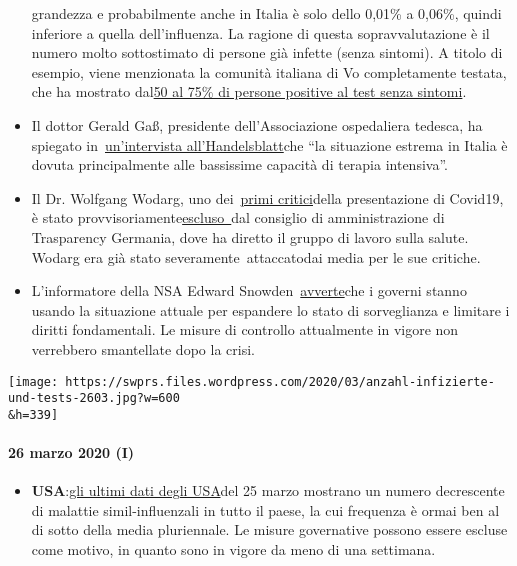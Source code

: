 \begin{itemize}
  grandezza e probabilmente anche in Italia è solo dello 0,01\% a
  0,06\%, quindi inferiore a quella dell'influenza. La ragione di questa
  sopravvalutazione è il numero molto sottostimato di persone già
  infette (senza sintomi). A titolo di esempio, viene menzionata la
  comunità italiana di Vo completamente testata, che ha mostrato
  dal\href{https://www.repubblica.it/salute/medicina-e-ricerca/2020/03/16/news/coronavirus_studio_il_50-75_dei_casi_a_vo_sono_asintomatici_e_molto_contagiosi-251474302/}{50
  al 75\% di persone positive al test senza sintomi}.
\item
  Il dottor Gerald Gaß, presidente dell'Associazione ospedaliera
  tedesca, ha spiegato
  in~\href{https://www.handelsblatt.com/politik/deutschland/coronakrise-deutsche-krankenhausgesellschaft-wir-sind-besser-vorbereitet-als-italien/25651268.html}{un'intervista
  all'Handelsblatt}che ``la situazione estrema in Italia è dovuta
  principalmente alle bassissime capacità di terapia intensiva''.
\item
  Il Dr. Wolfgang Wodarg, uno
  dei~\href{https://www.youtube.com/watch?v=p_AyuhbnPOI}{primi
  critici}della presentazione di Covid19, è stato
  provvisoriamente\href{https://www.transparency.de/aktuelles/detail/article/in-eigener-sache-vorstand-beschliesst-ruhen-der-mitgliedschaft-von-wolfgang-wodarg-1/}{escluso~}dal
  consiglio di amministrazione di Trasparency Germania, dove ha diretto
  il gruppo di lavoro sulla salute. Wodarg era già stato
  severamente~attaccatodai media per le sue critiche.
\item
  L'informatore della NSA Edward
  Snowden~\href{https://www.cnet.com/news/snowden-warns-government-surveillance-amid-covid-19-could-be-long-lasting/}{avverte}che
  i governi stanno usando la situazione attuale per espandere lo stato
  di sorveglianza e limitare i diritti fondamentali. Le misure di
  controllo attualmente in vigore non verrebbero smantellate dopo la
  crisi.
\end{itemize}

\texttt{[image: https://swprs.files.wordpress.com/2020/03/anzahl-infizierte-und-tests-2603.jpg?w=600\\\&h=339]}

\hypertarget{26-marzo-2020-i}{%
\paragraph{26 marzo 2020 (I)}\label{26-marzo-2020-i}}

\begin{itemize}
\tightlist
\item
  \textbf{USA}:\href{https://healthweather.us/}{gli ultimi dati degli
  USA}del 25 marzo mostrano un numero decrescente di malattie
  simil-influenzali in tutto il paese, la cui frequenza è ormai ben al
  di sotto della media pluriennale. Le misure governative possono essere
  escluse come motivo, in quanto sono in vigore da meno di una
  settimana.
\end{itemize}

